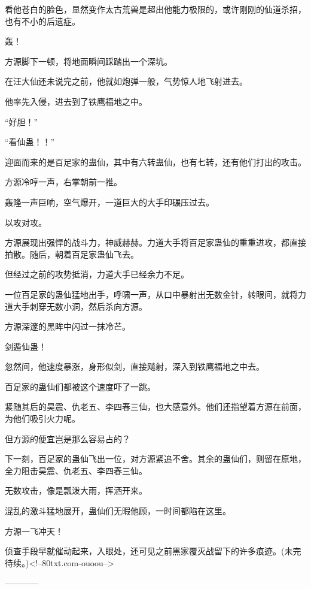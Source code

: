 \begin{this_body}
看他苍白的脸色，显然变作太古荒兽是超出他能力极限的，或许刚刚的仙道杀招，也有不小的后遗症。

轰！

方源脚下一顿，将地面瞬间踩踏出一个深坑。

在汪大仙还未说完之前，他就如炮弹一般，气势惊人地飞射进去。

他率先入侵，进去到了铁鹰福地之中。

“好胆！”

“看仙蛊！！”

迎面而来的是百足家的蛊仙，其中有六转蛊仙，也有七转，还有他们打出的攻击。

方源冷哼一声，右掌朝前一推。

轰隆一声巨响，空气爆开，一道巨大的大手印碾压过去。

以攻对攻。

方源展现出强悍的战斗力，神威赫赫。力道大手将百足家蛊仙的重重进攻，都直接拍散。随后，朝着百足家蛊仙飞去。

但经过之前的攻势抵消，力道大手已经余力不足。

一位百足家的蛊仙猛地出手，呼啸一声，从口中暴射出无数金针，转眼间，就将力道大手刺穿无数小洞，然后杀向方源。

方源深邃的黑眸中闪过一抹冷芒。

剑遁仙蛊！

忽然间，他速度暴涨，身形似剑，直接飚射，深入到铁鹰福地之中去。

百足家的蛊仙们都被这个速度吓了一跳。

紧随其后的昊震、仇老五、李四春三仙，也大感意外。他们还指望着方源在前面，为他们吸引火力呢。

但方源的便宜岂是那么容易占的？

下一刻，百足家的蛊仙飞出一位，对方源紧追不舍。其余的蛊仙们，则留在原地，全力阻击昊震、仇老五、李四春三仙。

无数攻击，像是瓢泼大雨，挥洒开来。

混乱的激斗猛地展开，蛊仙们无暇他顾，一时间都陷在这里。

方源一飞冲天！

侦查手段早就催动起来，入眼处，还可见之前黑家覆灭战留下的许多痕迹。(未完待续。)<!--80txt.com-ouoou-->

------------

\end{this_body}

